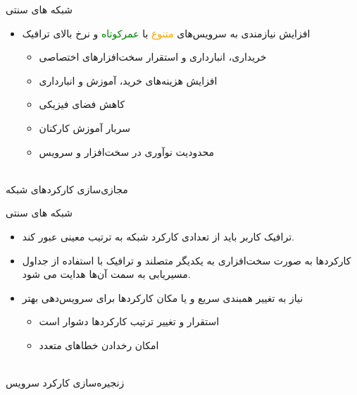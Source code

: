 \documentclass{beamer}
\makeatletter
\newcommand{\RTList}{\raggedleft\rightskip\@totalleftmargin}
\makeatother
\begin{document}
\begin{persian}
  \begin{frame}{شبکه های سنتی}
    \begin{itemize}\RTList{}
      \justifying
      \item
            افزایش نیازمندی به سرویس‌های
            \textcolor{orange}{متنوع}
            با
            \textcolor{green}{عمرکوتاه}
            و
            \textcolor{cyna}{نرخ بالای ترافیک}
            \begin{itemize}\RTList{}
              \item خریداری، انبارداری و استقرار سخت‌افزارهای اختصاصی
              \item افزایش هزینه‌های خرید، آموزش و انبارداری
              \item کاهش فضای فیزیکی
              \item سربار آموزش کارکنان
              \item محدودیت نوآوری در سخت‌افزار و سرویس
            \end{itemize}
    \end{itemize}
    \begin{block}{}
      \centering
      \\
      مجازی‌سازی کارکردهای شبکه
    \end{block}
  \end{frame}

  \begin{frame}{شبکه های سنتی}
    \begin{itemize}\RTList{}
      \justifying
      \item ترافیک کاربر باید از تعدادی کارکرد شبکه به ترتیب معینی عبور کند.
      \item کارکردها به صورت سخت‌افزاری به یکدیگر متصلند و ترافیک با استفاده از جداول مسیریابی به سمت آن‌ها هدایت می شود.
      \item نیاز به تغییر همبندی سریع و یا مکان کارکردها برای سرویس‌دهی بهتر
            \begin{itemize}\RTList{}
              \item استقرار و تغییر ترتیب کارکردها دشوار است
              \item امکان رخدادن خطاهای متعدد
            \end{itemize}
    \end{itemize}
    \begin{block}{}
      \centering
      \\
      زنجیره‌سازی کارکرد سرویس
    \end{block}
  \end{frame}


\end{persian}
\end{document}
